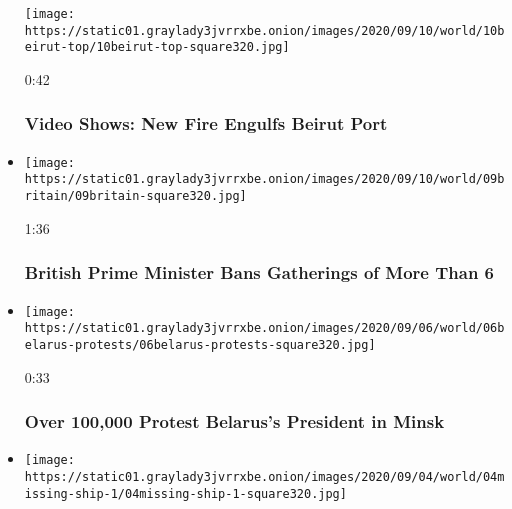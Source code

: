 \begin{itemize}
  \texttt{[image: https://static01.graylady3jvrrxbe.onion/images/2020/09/10/world/10beirut-top/10beirut-top-square320.jpg]}

  0:42

  \hypertarget{video-shows-new-fire-engulfs-beirut-port}{%
  \subsubsection{Video Shows: New Fire Engulfs Beirut
  Port}\label{video-shows-new-fire-engulfs-beirut-port}}
\item
  \href{https://www.nytimes3xbfgragh.onion/video/world/europe/100000007331793/boris-johnson-covid-restrictions.html?action=click\&module=video-series-bar\&region=header\&pgtype=Article\&playlistId=video/world}{}

  \texttt{[image: https://static01.graylady3jvrrxbe.onion/images/2020/09/10/world/09britain/09britain-square320.jpg]}

  1:36

  \hypertarget{british-prime-minister-bans-gatherings-of-more-than-6}{%
  \subsubsection{British Prime Minister Bans Gatherings of More Than
  6}\label{british-prime-minister-bans-gatherings-of-more-than-6}}
\item
  \href{https://www.nytimes3xbfgragh.onion/video/world/europe/100000007327321/belarus-protest.html?action=click\&module=video-series-bar\&region=header\&pgtype=Article\&playlistId=video/world}{}

  \texttt{[image: https://static01.graylady3jvrrxbe.onion/images/2020/09/06/world/06belarus-protests/06belarus-protests-square320.jpg]}

  0:33

  \hypertarget{over-100000-protest-belaruss-president-in-minsk}{%
  \subsubsection{Over 100,000 Protest Belarus's President in
  Minsk}\label{over-100000-protest-belaruss-president-in-minsk}}
\item
  \href{https://www.nytimes3xbfgragh.onion/video/world/asia/100000007325058/missing-livestock-ship-rescue.html?action=click\&module=video-series-bar\&region=header\&pgtype=Article\&playlistId=video/world}{}

  \texttt{[image: https://static01.graylady3jvrrxbe.onion/images/2020/09/04/world/04missing-ship-1/04missing-ship-1-square320.jpg]}


\end{itemize}
